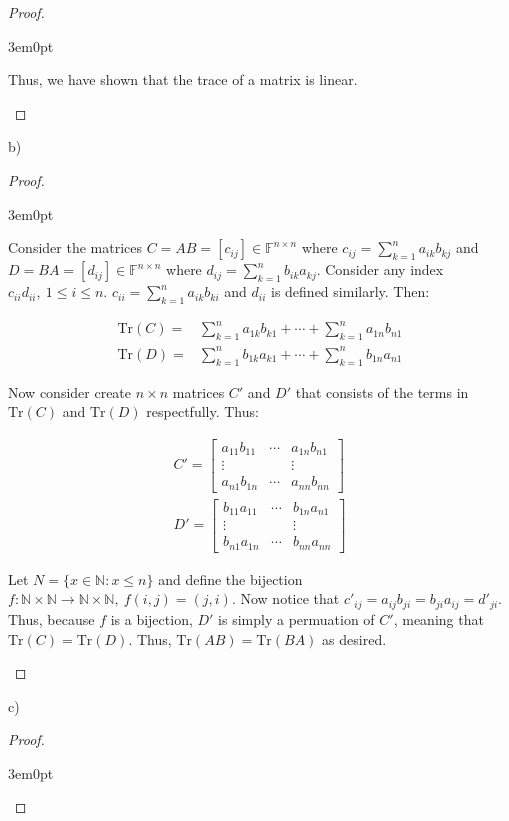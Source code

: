 \documentclass[11pt]{article}
\newcommand{\N}{\mathbb{N}}
\newcommand{\F}{\mathbb{F}}
\newenvironment{myproof}
{\begin{proof} \begin{adjustwidth}{3em}{0pt}$ $\par\nobreak\ignorespaces}
{\end{adjustwidth} \end{proof}}
\begin{document}
\begin{flushleft}
\begin{myproof}
Thus, we have shown that the trace of a matrix is linear.

\end{myproof}

b)

\begin{myproof}

Consider the matrices $C = AB = [c_{ij}] \in  \F^{n \times n}$ where $c_{ij} = \sum_{k = 1}^n a_{ik}b_{kj}$ and $D = BA = [d_{ij}] \in  \F^{n \times n}$ where $d_{ij} = \sum_{k = 1}^n b_{ik}a_{kj}$. Consider any index $c_{ii} d_{ii}, \ 1 \leq i \leq n$. $c_{ii} = \sum_{k=1}^n a_{ik}b_{ki}$ and $d_{ii}$ is defined similarly. Then:

\begin{align*}
\text{Tr}(C) = & \sum_{k=1}^n a_{1k}b_{k1} + \cdots + \sum_{k=1}^n a_{1n}b_{n1} \\
\text{Tr}(D) = & \sum_{k=1}^n b_{1k}a_{k1} + \cdots + \sum_{k=1}^n b_{1n}a_{n1}
\end{align*}

Now consider create $n \times n$ matrices $C'$ and $D'$ that consists of the terms in $\text{Tr}(C)$ and $\text{Tr}(D)$ respectfully. Thus:

\begin{align*}
C' =
\begin{bmatrix}
a_{11}b_{11} & \cdots & a_{1n}b_{n1} \\
\vdots & & \vdots \\
a_{n1}b_{1n} & \cdots & a_{nn}b_{nn}
\end{bmatrix} \\
D' =
\begin{bmatrix}
b_{11}a_{11} & \cdots & b_{1n}a_{n1} \\
\vdots & & \vdots \\
b_{n1}a_{1n} & \cdots & b_{nn}a_{nn}
\end{bmatrix}
\end{align*}

Let $N = \{ x \in \N: x \leq n \}$ and define the bijection $f: \N \times \N \rightarrow \N \times \N, \ f(i,j) = (j,i)$. Now notice that $c'_{ij} = a_{ij}b_{ji} = b_{ji}a_{ij} = d'_{ji}$. Thus, because $f$ is a bijection, $D'$ is simply a permuation of $C'$, meaning that $\text{Tr}(C) = \text{Tr}(D)$. Thus, $\text{Tr}(AB) = \text{Tr}(BA)$ as desired.

\end{myproof}

c)

\begin{myproof}


\end{myproof}
\end{flushleft}
\end{document}
